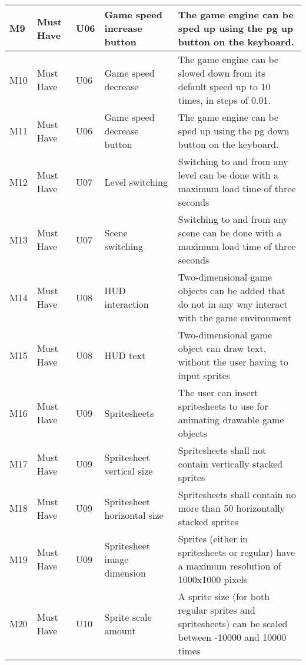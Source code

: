 \documentclass{article} %
\begin{document}
\begin{longtable}{|p{}|p{}|p{}|p{}|p{}|}
    M9                          & Must Have                          & U06                & Game speed increase button        & The game engine can be sped up using the pg up button on the keyboard.                                                                                      \\ \hline
    M10                         & Must Have                          & U06                & Game speed decrease               & The game engine can be slowed down from its default speed up to 10 times, in steps of 0.01.                                                                 \\ \hline
    M11                         & Must Have                          & U06                & Game speed decrease button        & The game engine can be sped up using the pg down button on the keyboard.                                                                                    \\ \hline
    M12                         & Must Have                          & U07                & Level switching & Switching to and from any level can be done with a maximum load time of three seconds \\ \hline
    M13 & Must Have & U07 &                                                                                         Scene switching & Switching to and from any scene can be done with a maximum load time of three seconds \\ \hline
    M14 & Must Have & U08 & HUD interaction & Two-dimensional game objects can be added that do not in any way interact with the game environment \\ \hline
    M15 & Must Have & U08 & HUD text & Two-dimensional game object can draw text, without the user having to input sprites \\ \hline
    M16 & Must Have & U09 & Spritesheets & The user can insert spritesheets to use for animating drawable game objects \\ \hline
    M17 & Must Have & U09 & Spritesheet vertical size & Spritesheets shall not contain vertically stacked sprites \\ \hline
    M18 & Must Have & U09 & Spritesheet horizontal size & Spritesheets shall contain no more than 50 horizontally stacked sprites \\ \hline
    M19 & Must Have & U09 & Spritesheet image dimension & Sprites (either in spritesheets or regular) have a maximum resolution of 1000x1000 pixels \\ \hline
    M20 & Must Have & U10 & Sprite scale amount & A sprite size (for both regular sprites and spritesheets) can be scaled between -10000 and 10000 times \\ \hline

\end{longtable}
\end{document}
